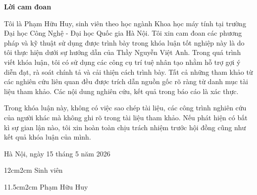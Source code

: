\setcounter{page}{1}
\begin{center}
\textbf{\large{Lời cam đoan}	}
\end{center}
Tôi là Phạm Hữu Huy, sinh viên theo học ngành Khoa học máy tính tại trường Đại học Công Nghệ - Đại học Quốc gia Hà Nội. Tôi xin cam đoan các phương pháp và kỹ thuật sử dụng được trình bày trong khóa luận tốt nghiệp này là do tôi thực hiện dưới sự hướng dẫn của Thầy Nguyễn Việt Anh. Trong quá trình viết khóa luận, tôi có sử dụng các công cụ trí tuệ nhân tạo nhằm hỗ trợ gợi ý diễn đạt, rà soát chính tả và cải thiện cách trình bày. Tất cả những tham khảo từ các nghiên cứu liên quan đều được trích dẫn nguồn gốc rõ ràng từ danh mục tài liệu tham khảo. Các nội dung nghiên cứu, kết quả trong báo cáo là xác thực. 

Trong khóa luận này, không có việc sao chép tài liệu, các công trình nghiên cứu của người khác mà không ghi rõ trong tài liệu tham khảo. Nếu phát hiện có bất kì sự gian lận nào, tôi xin hoàn toàn chịu trách nhiệm trước hội đồng cũng như kết quả khóa luận của mình.

\begin{flushright}
Hà Nội, ngày 15 tháng 5 năm 2026
\end{flushright}

\begin{changemargin}{12cm}{2cm}
Sinh viên
\\[2cm]
\end{changemargin}

\begin{changemargin}{11.5cm}{2cm}
Phạm Hữu Huy
\end{changemargin}